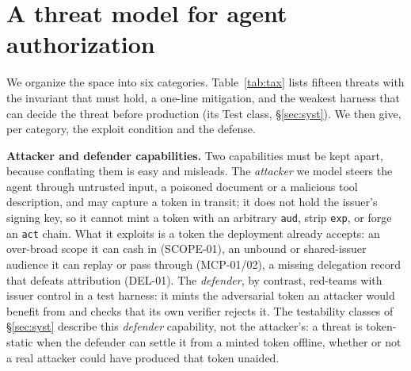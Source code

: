 \section{A threat model for agent authorization}\label{sec:tax}
We organize the space into six categories. Table~\ref{tab:tax} lists fifteen threats
with the invariant that must hold, a one-line mitigation, and the weakest harness that
can decide the threat before production (its Test class, \S\ref{sec:syst}). We then
give, per category, the exploit condition and the defense.

\noindent\textbf{Attacker and defender capabilities.} Two capabilities must be kept
apart, because conflating them is easy and misleads. The \emph{attacker} we model
steers the agent through untrusted input, a poisoned document or a malicious tool
description, and may capture a token in transit; it does not hold the issuer's signing
key, so it cannot mint a token with an arbitrary \texttt{aud}, strip \texttt{exp}, or
forge an \texttt{act} chain. What it exploits is a token the deployment already
accepts: an over-broad scope it can cash in (SCOPE-01), an unbound or shared-issuer
audience it can replay or pass through (MCP-01/02), a missing delegation record that
defeats attribution (DEL-01). The \emph{defender}, by contrast, red-teams with issuer
control in a test harness: it mints the adversarial token an attacker would benefit
from and checks that its own verifier rejects it. The testability classes of
\S\ref{sec:syst} describe this \emph{defender} capability, not the attacker's: a
threat is token-static when the defender can settle it from a minted token offline,
whether or not a real attacker could have produced that token unaided.

